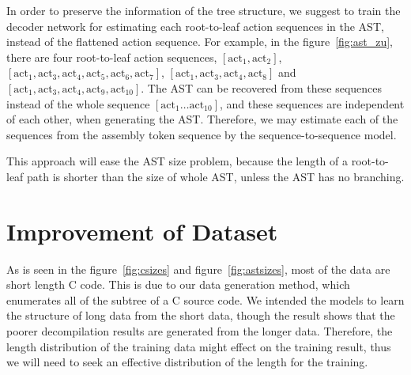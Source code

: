 \documentclass[senior,final,11pt]{iscs-thesis}
\begin{document}
In order to preserve the information of the tree structure, we suggest to train the decoder network for estimating each root-to-leaf action sequences in the AST,
instead of the flattened action sequence. 
For example, in the figure~\ref{fig:ast_zu}, there are four root-to-leaf action sequences, 
$ [\mathrm{act}_1, \mathrm{act}_2] $, $ [\mathrm{act}_1, \mathrm{act}_3,\mathrm{act}_4,\mathrm{act}_5,\mathrm{act}_6,\mathrm{act}_7] $, $ [\mathrm{act}_1, \mathrm{act}_3,\mathrm{act}_4,\mathrm{act}_8] $ and $ [\mathrm{act}_1, \mathrm{act}_3,\mathrm{act}_4,\mathrm{act}_9,\mathrm{act}_{10}] $.
The AST can be recovered from these sequences instead of the whole sequence $ [\mathrm{act}_1 \dots \mathrm{act}_{10}] $, 
and these sequences are independent of each other, when generating the AST.
Therefore, we may estimate each of the sequences from the assembly token sequence by the sequence-to-sequence model.

This approach will ease the AST size problem, because the length of a root-to-leaf path is shorter than the size of whole AST, unless the AST has no branching.







\section{Improvement of Dataset}
As is seen in the figure~\ref{fig:csizes} and figure~\ref{fig:astsizes}, most of the data are short length C code.
This is due to our data generation method, which enumerates all of the subtree of a C source code.
We intended the models to learn the structure of long data from the short data, though the result shows that 
the poorer decompilation results are generated from the longer data.
Therefore, the length distribution of the training data might effect on the training result, 
thus we will need to seek an effective distribution of the length for the training.


\end{document}
